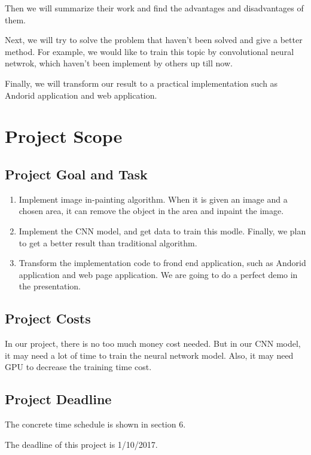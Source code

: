 \documentclass[12pt]{article}
\begin{document}
\qquad Then we will summarize their work and find the advantages and disadvantages of them. 

\qquad Next, we will try to solve the problem that haven't been solved and give a better method. For example, we would like to train this topic by convolutional neural netwrok, which haven't been implement by others up till now. 

\qquad Finally, we will transform our result to a practical implementation such as Andorid application and web application.



\section{Project Scope}
\subsection{Project Goal and Task}
\begin{enumerate}[1.]
	\item Implement image in-painting algorithm. When it is given an image and a chosen area, it can remove the object in the area and inpaint the image.
	\item Implement the CNN model, and get data to train this modle. Finally, we plan to get a better result than traditional algorithm.
	\item Transform the implementation code to frond end application, such as Andorid application and web page application. We are going to do a perfect demo in the presentation. 
\end{enumerate}
\subsection{Project Costs}
\qquad In our project, there is no too much money cost needed. But in our CNN model, it may need a lot of time to train the neural network model. Also, it may need GPU to decrease the training time cost.
\subsection{Project Deadline}
\qquad The concrete time schedule is shown in section 6. 

\qquad The deadline of this project is 1/10/2017.
\end{document}
